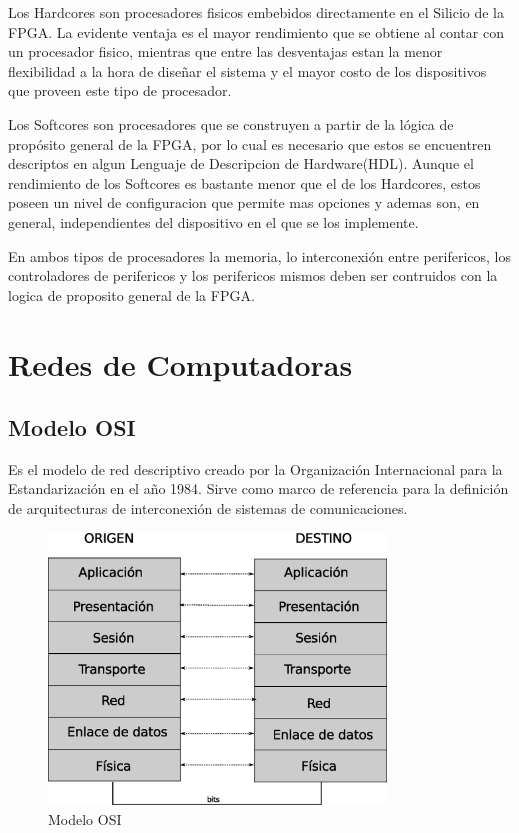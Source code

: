 Los Hardcores son procesadores fisicos embebidos directamente en el Silicio de la FPGA. La evidente ventaja es el mayor rendimiento que se obtiene al contar con un procesador fisico, mientras que entre las desventajas estan la menor flexibilidad a la hora de diseñar el sistema y el mayor costo de los dispositivos que proveen este tipo de procesador.

Los Softcores son procesadores que se construyen a partir de la lógica de propósito general de la FPGA, por lo cual es necesario que estos se encuentren descriptos en algun Lenguaje de Descripcion de Hardware(HDL). Aunque el rendimiento de los Softcores es bastante menor que el de los Hardcores, estos poseen un nivel de configuracion que permite mas opciones y ademas son, en general, independientes del dispositivo en el que se los implemente.

En ambos tipos de procesadores la memoria, lo interconexión entre perifericos, los controladores de perifericos y los perifericos mismos deben ser contruidos con la logica de proposito general de la FPGA.


\section{Redes de Computadoras}

\subsection{Modelo OSI}

Es el modelo de red descriptivo creado por la Organización Internacional para la Estandarización en el año 1984. Sirve como marco de referencia para la definición de arquitecturas de interconexión de sistemas de comunicaciones.

\begin{figure}[h]
  \centering
	\includegraphics[width=0.80\textwidth]{2-sistema/graf/osi.eps}
  \caption{Modelo OSI}
  \label{fig:osi}
\end{figure}

